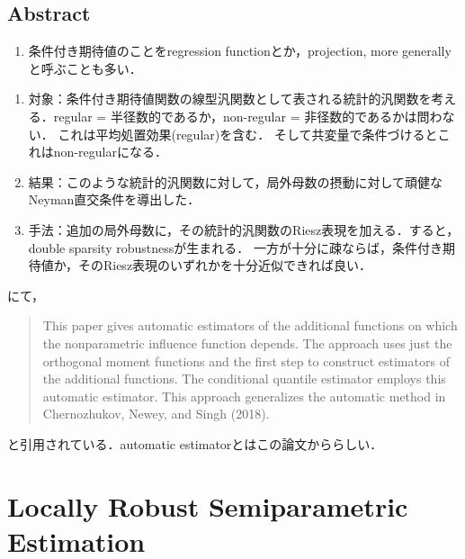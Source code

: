 \documentclass[uplatex,dvipdfmx]{jsreport}
\begin{document}
\subsection{Abstract}

\begin{notation}\mbox{}
    \begin{enumerate}
        \item 条件付き期待値のことをregression functionとか，projection, more generallyと呼ぶことも多い．
    \end{enumerate}
\end{notation}

\begin{enumerate}
    \item 対象：条件付き期待値関数の線型汎関数として表される統計的汎関数を考える．regular = 半径数的であるか，non-regular = 非径数的であるかは問わない．
    これは平均処置効果(regular)を含む．
    そして共変量で条件づけるとこれはnon-regularになる．
    \item 結果：このような統計的汎関数に対して，局外母数の摂動に対して頑健なNeyman直交条件を導出した．
    \item 手法：追加の局外母数に，その統計的汎関数のRiesz表現を加える．すると，double sparsity robustnessが生まれる．
    一方が十分に疎ならば，条件付き期待値か，そのRiesz表現のいずれかを十分近似できれば良い．
\end{enumerate}

\begin{cited}
    \cite{Chernozhukov-Ichimura-Newey22-LocallyRobust}にて，
    \begin{quote}
        This paper gives automatic estimators of the additional functions on which the nonparametric
        influence function depends. The approach uses just the orthogonal moment functions
        and the first step to construct estimators of the additional functions. The conditional quantile
        estimator employs this automatic estimator. This approach generalizes the automatic method
        in Chernozhukov, Newey, and Singh (2018).
    \end{quote}
    と引用されている．automatic estimatorとはこの論文かららしい．
\end{cited}

\section{Locally Robust Semiparametric Estimation \cite{Chernozhukov-Ichimura-Newey22-LocallyRobust}}
\end{document}
